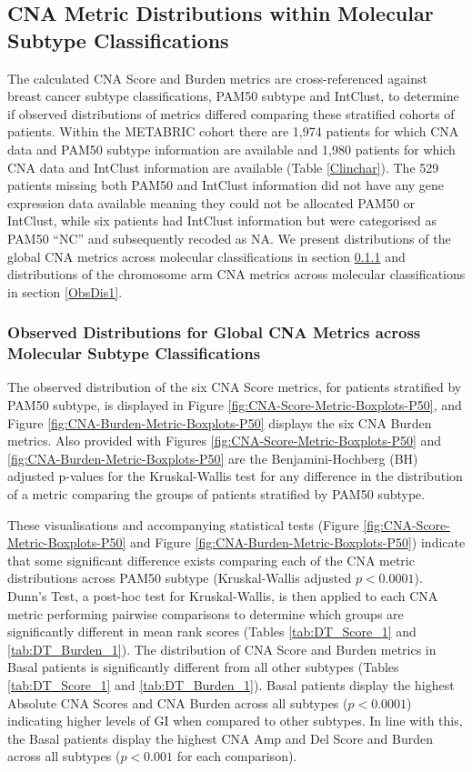 \subsection{CNA Metric Distributions within Molecular Subtype Classifications}
\label{LGI}
The calculated CNA Score and Burden metrics are cross-referenced against breast cancer subtype classifications, PAM50 subtype and IntClust, to determine if observed distributions of metrics differed comparing these stratified cohorts of patients. Within the METABRIC cohort there are 1,974 patients for which CNA data and PAM50 subtype information are available and 1,980 patients for which CNA data and IntClust information are available (Table \ref{Clinchar}). The 529 patients missing both PAM50 and IntClust information did not have any gene expression data available meaning they could not be allocated PAM50 or IntClust, while six patients had IntClust information but were categorised as PAM50 “NC” and subsequently recoded as NA. We present distributions of the global CNA metrics across molecular classifications in section \ref{ObsDis} and distributions of the chromosome arm CNA metrics across molecular classifications in section \ref{ObsDis1}.

\subsubsection{Observed Distributions for Global CNA Metrics across Molecular Subtype Classifications}
\label{ObsDis}
The observed distribution of the six CNA Score metrics, for patients stratified by PAM50 subtype, is displayed in Figure \ref{fig:CNA-Score-Metric-Boxplots-P50}, and Figure \ref{fig:CNA-Burden-Metric-Boxplots-P50} displays the six CNA Burden metrics. Also provided with Figures \ref{fig:CNA-Score-Metric-Boxplots-P50} and \ref{fig:CNA-Burden-Metric-Boxplots-P50} are the Benjamini-Hochberg (BH) adjusted p-values for the Kruskal-Wallis test for any difference in the distribution of a metric comparing the groups of patients stratified by PAM50 subtype. 

These visualisations and accompanying statistical tests (Figure \ref{fig:CNA-Score-Metric-Boxplots-P50} and Figure \ref{fig:CNA-Burden-Metric-Boxplots-P50}) indicate that some significant difference exists comparing each of the CNA metric distributions across PAM50 subtype (Kruskal-Wallis adjusted $p<0.0001$). Dunn's Test, a post-hoc test for Kruskal-Wallis, is then applied to each CNA metric performing pairwise comparisons to determine which groups are significantly different in mean rank scores (Tables \ref{tab:DT_Score_1} and \ref{tab:DT_Burden_1}). The distribution of CNA Score and Burden metrics in Basal patients is significantly different from all other subtypes (Tables \ref{tab:DT_Score_1} and \ref{tab:DT_Burden_1}). Basal patients display the highest Absolute CNA Scores and CNA Burden across all subtypes ($p<0.0001$) indicating higher levels of GI when compared to other subtypes. In line with this, the Basal patients display the highest CNA Amp and Del Score and Burden across all subtypes ($p<0.001$ for each comparison).

